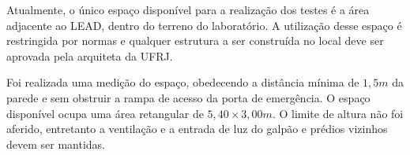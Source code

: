 Atualmente, o único espaço disponível para a realização dos testes é a área
adjacente ao LEAD, dentro do terreno do laboratório.
A utilização desse espaço é restringida por normas e qualquer estrutura a ser
construída no local deve ser aprovada pela arquiteta da UFRJ. 

Foi realizada uma medição do espaço, obedecendo a distância mínima de $1,5m$
da parede e sem obstruir a rampa de acesso da porta de emergência. O espaço
disponível ocupa uma área retangular de $5,40\times3,00m$. O limite de altura
não foi aferido, entretanto a ventilação e a entrada de luz do galpão e prédios
vizinhos devem ser mantidas.


